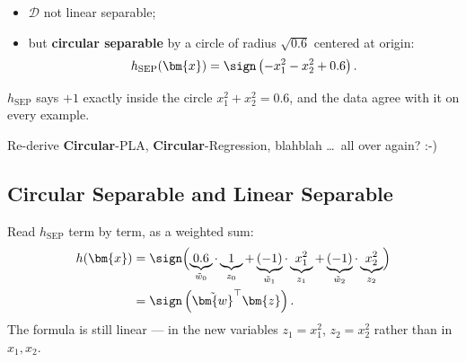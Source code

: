 \begin{itemize}
    \item \(\mathcal{D}\) not linear separable;
    \item but \textbf{circular separable} by a circle of radius \(\sqrt{0.6}\)
        centered at origin:
        \[
            h_{\mathrm{SEP}}(\bm{x}) = \sign \left( -x_1^2 - x_2^2 + 0.6
            \right) .
        \]
\end{itemize}

\(h_{\mathrm{SEP}}\) says \(+1\) exactly inside the circle \(x_1^2 + x_2^2 =
0.6\), and the data agree with it on every example.

\begin{question}
    Re-derive \textbf{Circular}-PLA, \textbf{Circular}-Regression, blahblah
    \ldots\ all over again? :-)
\end{question}

\subsection{Circular Separable and Linear Separable}

Read \(h_{\mathrm{SEP}}\) term by term, as a weighted sum:
\begin{align*}
    h(\bm{x}) &= \sign \Bigl( \underbrace{0.6}_{\tilde{w}_0} \cdot
    \underbrace{1}_{z_0} + \underbrace{(-1)}_{\tilde{w}_1} \cdot
    \underbrace{x_1^2}_{z_1} + \underbrace{(-1)}_{\tilde{w}_2} \cdot
    \underbrace{x_2^2}_{z_2} \Bigr)\\
    &= \sign \left( \tilde{\bm{w}}^\top \bm{z} \right) .
\end{align*}
The formula is still linear --- in the new variables \(z_1 = x_1^2\), \(z_2 =
x_2^2\) rather than in \(x_1, x_2\).

\begin{center}
\end{center}

